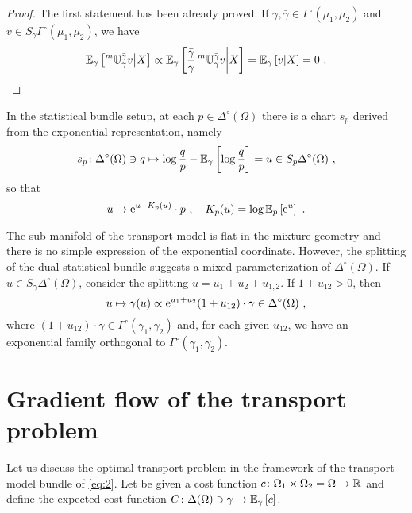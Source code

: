 \documentclass[runningheads]{llncs}
\begin{document}
\begin{proof}
The first statement has been already proved. If $\gamma,\bar\gamma \in \Gamma^\circ (\mu_1,\mu_2)$ and $v \in S_{\gamma}\Gamma^\circ(\mu_1,\mu_2)$, we have
\begin{equation*}
  {\operatorname{\mathbb E}}_{\bar\gamma}\left[\prescript{m}{}{\mathbb U}_{\gamma}^{\bar\gamma} v \middle| X\right] \propto {\operatorname{\mathbb E}}_{\gamma}\left[\frac {\bar\gamma}{\gamma} \prescript{m}{}{\mathbb U}_{\gamma}^{\bar\gamma} v \middle| X\right] = {\operatorname{\mathbb E}}_{\gamma}\left[v \middle| X\right] = 0 \ . 
\end{equation*}
\end{proof}
\begin{remark}
  In the statistical bundle setup, at each $p \in \Delta^\circ(\Omega)$ there is a chart $s_p$ derived from the exponential representation, namely
\begin{equation*}
 s_p \colon \Delta^\circ(\Omega) \ni q \mapsto \log \frac q p - {\operatorname{\mathbb E}}_{\gamma}\left[\log \frac q p\right] = u \in S_p\Delta^\circ(\Omega) \ ,
\end{equation*}
so that
\begin{equation*}
  u \mapsto \mathrm{e}^{u - K_p(u)} \cdot p \ , \quad K_p(u) = \log {\operatorname{\mathbb E}}_{p}\left[\mathrm{e}^u\right] \ .
\end{equation*}

The sub-manifold of the transport model is flat in the mixture geometry and there is no simple expression of the exponential coordinate. However, the splitting of the dual statistical bundle suggests a mixed parameterization of $\Delta^\circ(\Omega)$. If $u \in S_\gamma \Delta^\circ(\Omega)$, consider the splitting $u = u_1+u_2+u_{1,2}$.
If $1 + u_{12} > 0$, then
\begin{equation*}
  u \mapsto \gamma(u) \propto \euler^{u_1+u_2} (1+u_{12})\cdot \gamma \in \Delta^\circ(\Omega)\ ,
\end{equation*}
where $(1+u_{12}) \cdot \gamma \in \Gamma^\circ(\gamma_1,\gamma_2)$ and, for each given $u_{12}$, we have an exponential family orthogonal to $\Gamma^\circ(\gamma_1,\gamma_2)$.
\end{remark}

\section{Gradient flow of the transport problem}

Let us discuss the optimal transport problem in the framework of the transport model bundle of \cref{eq:2}. Let be given a cost function $c \colon \Omega_1 \times \Omega_2 = \Omega \to \mathbb R$ and define the expected cost function $C \colon \Delta(\Omega)\ni \gamma \mapsto {\operatorname{\mathbb E}}_{\gamma}\left[c\right]$.
\end{document}
